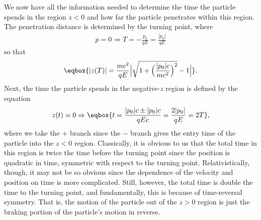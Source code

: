 {We now have all the information needed to determine the time the particle spends in the region $z < 0$ and how far the particle penetrates within this region.
The penetration distance is determined by the turning point, where
\begin{align}
    p = 0 \Rightarrow T = -\frac{p_0}{qE} = \frac{|p_0|}{qE}
\end{align}
so that
\begin{align}
    \eqbox{ |z(T)| = \frac{mc^2}{qE} \Big| \sqrt{1 + \Big( \frac{|p_0|c}{mc^2} \Big)^2 } - 1 \Big| }
.\end{align}
Next, the time the particle spends in the negative-$z$ region is defined by the equation
\begin{align}
    z(t) = 0 \Rightarrow \eqbox{ t = \frac{|p_0| c \pm |p_0| c}{q E c} = \frac{2 |p_0|}{q E} = 2 T }
,\end{align}
where we take the $+$ branch since the $-$ branch gives the entry time of the particle into the $z < 0$ region.
Classically, it is obvious to us that the total time in this region is twice the time before the turning point since the position is quadratic in time, symmetric with respect to the turning point.
Relativistically, though, it may not be so obvious since the dependence of the velocity and position on time is more complicated.
Still, however, the total time is double the time to the turning point, and fundamentally, this is because of time-reversal symmetry.
That is, the motion of the particle out of the $z > 0$ region is just the braking portion of the particle's motion in reverse.

}



